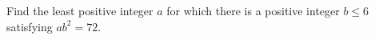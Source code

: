 Find the least positive integer $a$ for which there is a positive integer $b\le6$ satisfying $ab^2=72$.
